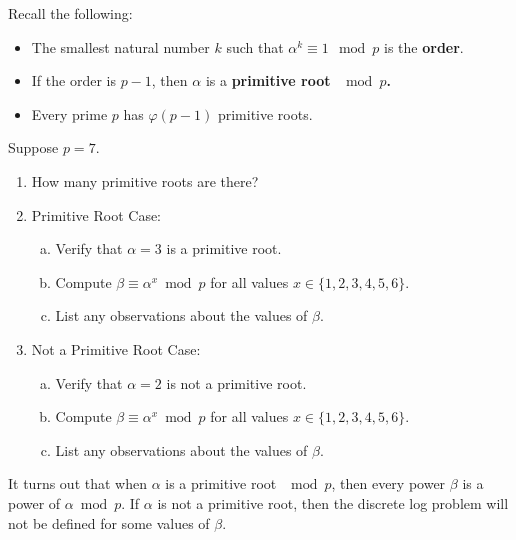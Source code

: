 \documentclass[12pt]{amsart}
\theoremstyle{plain}
\theoremstyle{definition}
\theoremstyle{remark}
\begin{document}
Recall the following:
\begin{itemize}
	\item The smallest natural number $k$ such that $\alpha^k \equiv 1 \mod p$ is the \textbf{order}.
	\item If the order is $p-1$, then $\alpha$ is a \textbf{primitive root $\mod p$.}
	\item Every prime $p$ has $\varphi(p-1)$ primitive roots.
\end{itemize}

Suppose $p = 7$.  
\begin{enumerate}[1.]
	\item How many primitive roots are there?\\ \vspace{1in}
	\item Primitive Root Case:
	\begin{enumerate}[a.]
		\item Verify that $\alpha = 3$ is a primitive root.\\ \vspace{1in}
		\item Compute $\beta \equiv \alpha ^x \bmod p$ for all values $x \in \{1,2,3,4,5,6\}$.\vspace{1in}
		\item List any observations about the values of $\beta.$\\ \vspace{1in}
	\end{enumerate}
	\newpage \item Not a Primitive Root Case:
		\begin{enumerate}[a.]
		\item Verify that $\alpha = 2$ is not a primitive root.\\ \vspace{1in}
		\item Compute $\beta \equiv \alpha ^x \bmod p$ for all values $x \in \{1,2,3,4,5,6\}$.\vspace{1in}
		\item List any observations about the values of $\beta.$\\ \vspace{1in}
	\end{enumerate}
\end{enumerate}

\begin{framed}
It turns out that when $\alpha$ is a primitive root $\mod p$, then every power $\beta$ is a power of $\alpha \bmod p$.  If $\alpha$ is not a primitive root, then the discrete log problem will not be defined for some values of $\beta$.
\end{framed}
\end{document}
